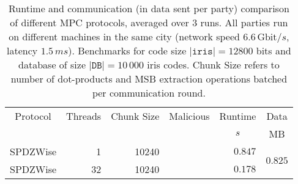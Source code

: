 \documentclass[a4paper,11pt,
]{article}
\newcommand{\cmark}{\ding{51}}%
\begin{document}
\begin{table}[ht]
    \centering
    \caption{Runtime and communication (in data sent per party) comparison of different MPC protocols, averaged over 3 runs. All parties run on different machines in the same city (network speed $6.6\,\text{Gbit}/s$, latency $1.5\,ms$). Benchmarks for code size $|\texttt{iris}| = 12800$ bits and database of size $|\texttt{DB}| = 10\,000$ iris codes. Chunk Size refers to number of dot-products and MSB extraction operations batched per communication round.}
    \label{tab::bench_network_10k}
    \begin{tabular}{lrrcrr}
        \toprule
        \multicolumn{1}{c}{Protocol} & \multicolumn{1}{c}{Threads} & \multicolumn{1}{c}{Chunk Size} & \multicolumn{1}{c}{Malicious} & \multicolumn{1}{c}{Runtime} & \multicolumn{1}{c}{Data} \\
                                     &                             &                                &                               & \multicolumn{1}{c}{$s$}     & \multicolumn{1}{c}{MB}   \\
        \midrule
        SPDZWise                     & 1                           & 10240                          & \cmark                        & $0.847$                     & \multirow{2}{*}{$0.825$} \\
        SPDZWise                     & 32                          & 10240                          & \cmark                        & $0.178$                     &                          \\
        \bottomrule
    \end{tabular}
\end{table}
\end{document}
